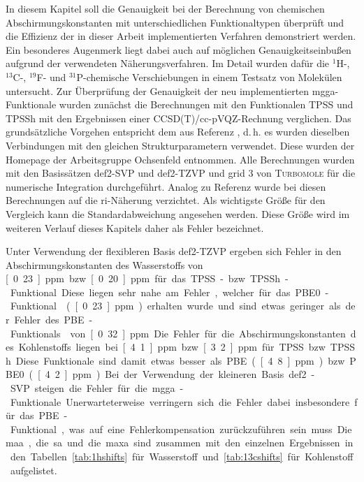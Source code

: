 In diesem Kapitel soll die Genauigkeit bei der Berechnung von chemischen Abschirmungskonstanten mit unterschiedlichen Funktionaltypen überprüft und die Effizienz der in dieser Arbeit implementierten Verfahren demonstriert werden. Ein besonderes Augenmerk liegt dabei auch auf möglichen Genauigkeitseinbußen aufgrund der verwendeten Näherungsverfahren. Im Detail wurden dafür die $^1$H-, $^{13}$C-, $^{19}$F- und $^{31}$P-chemische Verschiebungen in einem Testsatz von Molekülen untersucht.\supercite{reiter2017calculation} Zur Überprüfung der Genauigkeit der neu implementierten \ac{mgga}-Funktionale wurden zunächst die Berechnungen mit den Funktionalen TPSS\supercite{tao2003climbing} und TPSSh\supercite{staroverov2003comparative} mit den Ergebnissen einer CCSD(T)/cc-pVQZ\supercite{dunning1989gaussian,woon1993gaussian}-Rechnung verglichen. Das grundsätzliche Vorgehen entspricht dem aus Referenz \cite{flaig2014benchmarking}, d.\,h. es wurden dieselben Verbindungen mit den gleichen Strukturparametern verwendet. Diese wurden der Homepage der Arbeitsgruppe Ochsenfeld\supercite{ochsenfeld:structures} entnommen. Alle Berechnungen wurden mit den Basissätzen def2-SVP und def2-TZVP\supercite{weigend2005balanced} und grid 3\supercite{treutler1995efficient,treutlerphdthesis} von \textsc{Turbomole} für die numerische Integration durchgeführt. Analog zu Referenz \cite{ochsenfeld2004ab} wurde bei diesen Berechnungen auf die \ac{ri}-Näherung verzichtet. Als wichtigste Größe für den Vergleich kann die Standardabweichung angesehen werden.\supercite{flaig2014benchmarking} Diese Größe wird im weiteren Verlauf dieses Kapitels daher als \glqq Fehler\grqq{} bezeichnet.

Unter Verwendung der flexibleren Basis def2-TZVP ergeben sich Fehler in den Abschirmungskonstanten des Wasserstoffs von \unit[0.23]{ppm} bzw. \unit[0.20]{ppm} für das TPSS- bzw. TPSSh-Funktional. Diese liegen sehr nahe am Fehler, welcher für das PBE0-Funktional\supercite{adamo1999toward} (\unit[0.23]{ppm}) erhalten wurde und sind etwas geringer als der Fehler des PBE-Funktionals\supercite{perdew1996generalized} von \unit[0.32]{ppm}. Die Fehler für die Abschirmungskonstanten des Kohlenstoffs liegen bei \unit[4.1]{ppm} bzw. \unit[3.2]{ppm} für TPSS bzw. TPSSh. Diese Funktionale sind damit etwas besser als PBE (\unit[4.8]{ppm}) bzw. PBE0 (\unit[4.2]{ppm}). Bei der Verwendung der kleineren Basis def2-SVP steigen die Fehler für die \ac{mgga}-Funktionale. Unerwarteterweise verringern sich die Fehler dabei insbesondere für das PBE-Funktional, was auf eine Fehlerkompensation zurückzuführen sein muss. Die \ac{maa}, die \ac{sa} und die \ac{maxa} sind zusammen mit den einzelnen Ergebnissen in den Tabellen \ref{tab:1hshifts} für Wasserstoff und \ref{tab:13cshifts} für Kohlenstoff aufgelistet.

